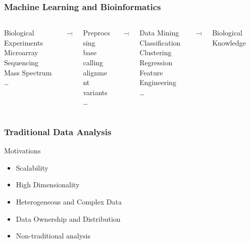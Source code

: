 \documentclass[UTF8]{beamer}\usepackage[]{graphicx}\usepackage[]{color}
\begin{document}
\begin{frame}
  \frametitle{Machine Learning and Bioinformatics}
\begin{columns}[c]
\begin{column}{.2\textwidth}
\small{Biological Experiments}\\
\tiny{Microarray}\\
\tiny{Sequencing}\\
\tiny{Mass Spectrum}\\
\ldots
\end{column}
\begin{column}{.05\textwidth}
$\rightarrow$
\end{column}
\begin{column}{.2\textwidth}
\small{Preprocssing}\\
\tiny{base calling}\\
\tiny{alignment}\\
\tiny{variants}\\
\ldots
\end{column}
\begin{column}{.05\textwidth}
$\rightarrow$
\end{column}
\begin{column}{.25\textwidth}
Data Mining\\
\tiny{Classification}\\
\tiny{Clustering}\\
\tiny{Regression}\\
\tiny{Feature Engineering}\\
\ldots
\end{column}

\begin{column}{.05\textwidth}
$\rightarrow$
\end{column}

\begin{column}{.2\textwidth}
Biological Knowledge
\end{column}
\end{columns}
\end{frame}


\begin{frame}
  \frametitle{Traditional Data Analysis}

  \begin{block}{Motivations}
\begin{itemize}
\item Scalability
\item High Dimensionality
\item Heterogeneous and Complex Data
\item Data Ownership and Distribution
\item Non-traditional analysis
\end{itemize}
  \end{block}
\end{frame}
\end{document}
